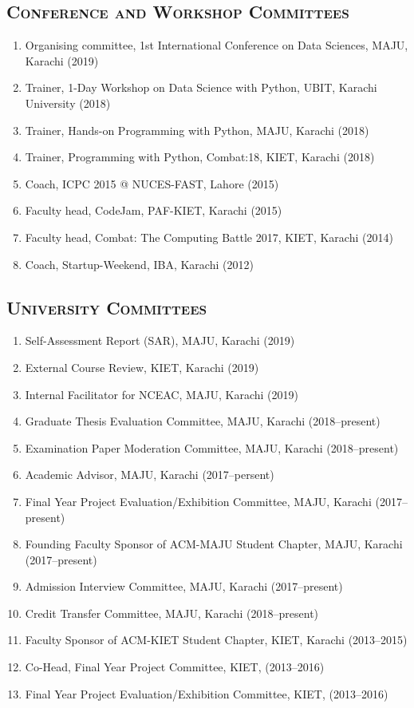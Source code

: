 \documentclass[a4paper, 10pt]{article}
\begin{document}
\subsection*{\normalfont\textsc{\bf Conference and Workshop Committees}}
\begin{enumerate}
\itemsep-4pt
\item Organising committee, 1st International Conference on Data Sciences, MAJU, Karachi (2019)
\item Trainer, 1-Day Workshop on Data Science with Python, UBIT, Karachi University (2018)
\item  Trainer, Hands-on Programming with Python, MAJU, Karachi (2018)
\item  Trainer, Programming with Python, Combat:18, KIET, Karachi (2018)
\item  Coach, ICPC 2015 @ NUCES-FAST, Lahore (2015)
\item  Faculty head, CodeJam, PAF-KIET, Karachi (2015)
\item  Faculty head, Combat: The Computing Battle 2017, KIET, Karachi (2014)
\item  Coach, Startup-Weekend, IBA, Karachi (2012)
\end{enumerate}

\subsection*{\normalfont\textsc{\bf University Committees}}
\begin{enumerate}
\itemsep-4pt 
\item Self-Assessment Report (SAR), MAJU, Karachi (2019)
\item External Course Review, KIET, Karachi (2019)
\item Internal Facilitator for NCEAC, MAJU, Karachi (2019)
\item Graduate Thesis Evaluation Committee, MAJU, Karachi (2018--present)
\item Examination Paper Moderation Committee, MAJU, Karachi (2018--present)
\item Academic Advisor, MAJU, Karachi (2017--persent)
\item Final Year Project Evaluation/Exhibition Committee, MAJU, Karachi (2017--present)
\item Founding Faculty Sponsor of ACM-MAJU Student Chapter, MAJU, Karachi (2017--present)
\item Admission Interview Committee, MAJU, Karachi (2017--present)
\item Credit Transfer Committee, MAJU, Karachi (2018--present)
\item Faculty Sponsor of ACM-KIET Student Chapter, KIET, Karachi (2013--2015)
\item Co-Head, Final Year Project Committee, KIET, (2013--2016)
\item Final Year Project Evaluation/Exhibition Committee, KIET, (2013--2016)
\end{enumerate}
\end{document}
